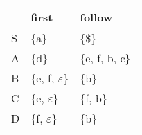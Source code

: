 \documentclass{standalone}
\providecommand\lightrule{%
	\arrayrulecolor{black!30}%
	\midrule[\lightrulewidth]%
	\arrayrulecolor{black}}
\begin{document}
\begin{tabularx}{\textwidth}{XXX}
    & first & follow\\
    \midrule
        S
        & %
        \{a\}
        & %
        \{\$\}
        \\ \lightrule
        A
        & %
        \{d\}
        & %
        \{e, f, b, c\}
        \\ \lightrule
        B
        & %
        \{e, f, \(\varepsilon\)\}
        & %
        \{b\}
        \\ \lightrule
        C
        & %
        \{e, \(\varepsilon\)\}
        & %
        \{f, b\}
        \\ \lightrule
        D
        & %
        \{f, \(\varepsilon\)\}
        & %
        \{b\}
\end{tabularx}
\end{document}
